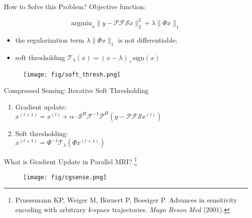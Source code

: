 \begin{frame}{How to Solve this Problem?}
	Objective function:

	\begin{equation}
		\mathrm{argmin}_x \lVert y -  \mathcal{P} \mathcal{F} \mathcal{S} x \rVert_2^2 + \lambda \lVert \Phi x \rVert_1
	\end{equation}

	\begin{itemize}
		\item the regularization term $\lambda \lVert \Phi x \rVert_1$ is not differentiable;
		\item soft thresholding $\mathcal{T}_\lambda(x) = (x - \lambda)_+ \mathrm{sign}(x)$
	\end{itemize}

	\begin{figure}
		\centering
		\texttt{[image: fig/soft\_thresh.png]}
	\end{figure}

\end{frame}


\begin{frame}{Compressed Sensing: Iterative Soft Thresholding}
	\begin{enumerate}
		\item Gradient update:\\
		\hspace{4em} $x^{(t+1)} = x^{(t)} + \alpha \cdot \mathcal{S}^H \mathcal{F}^{-1} \mathcal{P}^{H} (y - \mathcal{P} \mathcal{F} \mathcal{S} x^{(t)})$
		\vspace{2em}
		\item Soft thresholding:\\
		\hspace{4em} $x^{(t+1)} = \Phi^{-1}\mathcal{T}_\lambda(\Phi x^{(t+1)})$
	\end{enumerate}

%

\end{frame}


\begin{frame}{What is Gradient Update in Parallel MRI? \footnote{Pruessmann KP, Weiger M, B\"ornert P, Boesiger P. Advances in sensitivity encoding with arbitrary $k$-space trajectories. \textit{Magn Reson Med} (2001).}}
	\begin{figure}
		\centering
		\texttt{[image: fig/cgsense.png]}
	\end{figure}
\end{frame}


